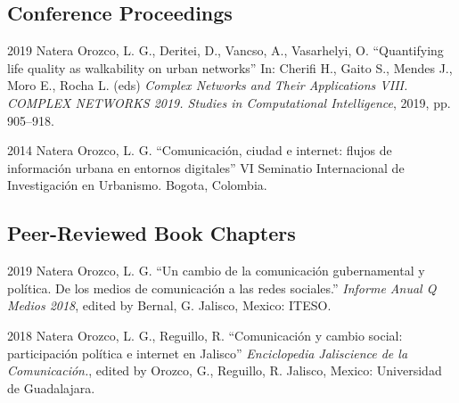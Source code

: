 \documentclass{academiccv}
\begin{document}

	

\subsection*{Conference Proceedings}
\begin{tablist}
	\item[2019] \tab Natera Orozco, L. G., Deritei, D., Vancso, A., Vasarhelyi, O. \enquote{Quantifying life quality as walkability on urban networks} In: Cherifi H., Gaito S., Mendes J., Moro E., Rocha L. (eds) \textit{Complex Networks and Their Applications VIII. COMPLEX NETWORKS 2019. Studies in Computational Intelligence}, 2019, pp. 905–918.
	\item[2014] \tab Natera Orozco, L. G. \enquote{Comunicación, ciudad e internet: flujos de información urbana en entornos digitales} VI Seminatio Internacional de Investigación en Urbanismo. Bogota, Colombia.
\end{tablist}

\subsection*{Peer-Reviewed Book Chapters}
\begin{tablist}
	\item[2019] \tab Natera Orozco, L. G. \enquote{Un cambio de la comunicación gubernamental y política. De los medios de comunicación a las redes sociales.} \textit{Informe Anual Q Medios 2018}, edited by Bernal, G. Jalisco, Mexico: ITESO.
	\item[2018] \tab Natera Orozco, L. G., Reguillo, R. \enquote{Comunicación y cambio social: participación política e internet en Jalisco} \textit{Enciclopedia Jaliscience de la Comunicación.}, edited by Orozco, G., Reguillo, R. Jalisco, Mexico: Universidad de Guadalajara.
\end{tablist}
\end{document}
